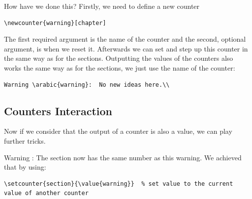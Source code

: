 \documentclass[a4paper,10pt]{report} %
\begin{document}
 How have we done this? Firstly, we need to define a new counter
\begin{lstlisting}[language={[latex]tex}, frame=single,basicstyle=\footnotesize]
  \newcounter{warning}[chapter] 
\end{lstlisting}
The first required argument is the name of the counter and the second, optional argument, is when we reset it.
Afterwards we can set and step up this counter in the same way as for the sections. Outputting the values  of the counters also works the same way as for the sections, we just use the name of the counter:
\begin{lstlisting}[language={[latex]tex}, frame=single,basicstyle=\footnotesize]
  Warning \arabic{warning}:  No new ideas here.\\
\end{lstlisting}

\setcounter{section}{\value{warning}}

\subsection{Counters Interaction}
Now if we consider that the output of a counter is also a value, we can play further tricks. 

Warning :  The section now has the same number as this warning. We achieved that by using:\\

\begin{lstlisting}[language={[latex]tex}, frame=single,basicstyle=\footnotesize]
\setcounter{section}{\value{warning}}  % set value to the current  value of another counter 
\end{lstlisting}




\newpage 
\end{document}
